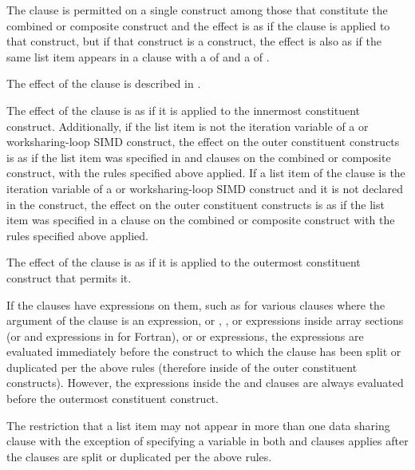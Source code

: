 The  clause is permitted on a single construct among those that
constitute the combined or composite construct and the effect is as if the clause 
is applied to that construct, but if that construct is a  construct, 
the effect is also as if the same list item appears in a  clause with a 
 of  and a  of .

The effect of the  clause is described in .
 
The effect of the  clause is as if it is applied to the innermost
constituent construct. Additionally, if the list item is not the iteration 
variable of a  or worksharing-loop SIMD construct, the effect on 
the outer constituent constructs is as if the list item was specified in 
 and  clauses on the combined or composite 
construct, with the rules specified above applied. If a list item of the 
 clause is the iteration variable of a  or worksharing-loop 
SIMD construct and it is not declared in the construct, the effect on the outer 
constituent constructs is as if the list item was specified in a  
clause on the combined or composite construct with the rules specified above applied.

The effect of the  clause is as if it is applied to the outermost 
constituent construct that permits it.

If the clauses have expressions on them, such as for various clauses where the 
argument of the clause is an expression, or , , or 
 expressions inside array sections (or  and  
expressions in  for Fortran), or  or
 expressions, the expressions are evaluated immediately before 
the construct to which the clause has been split or duplicated per the above 
rules (therefore inside of the outer constituent constructs). However, the 
expressions inside the  and  clauses are 
always evaluated before the outermost constituent construct.

The restriction that a list item may not appear in more than one data
sharing clause with the exception of specifying a variable in both
 and  clauses applies after the clauses
are split or duplicated per the above rules.

